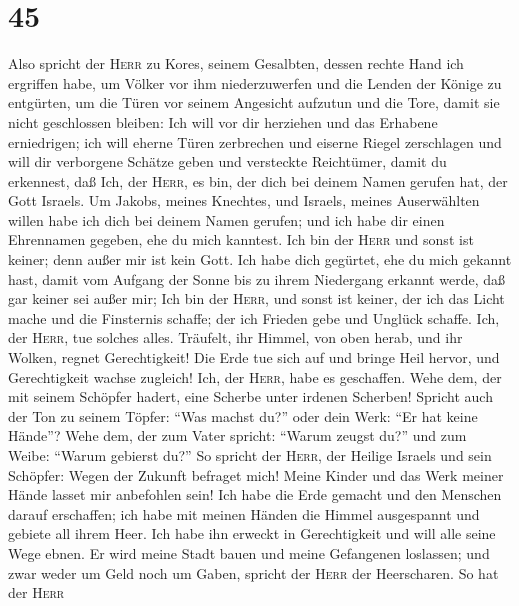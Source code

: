 \hypertarget{section-44}{%
\section{45}\label{section-44}}

 Also spricht der \textsc{Herr} zu Kores, seinem
Gesalbten, dessen rechte Hand ich ergriffen habe, um Völker vor ihm
niederzuwerfen und die Lenden der Könige zu entgürten, um die Türen vor
seinem Angesicht aufzutun und die Tore, damit sie nicht geschlossen
bleiben:  Ich will vor dir herziehen und das Erhabene
erniedrigen; ich will eherne Türen zerbrechen und eiserne Riegel
zerschlagen  und will dir verborgene Schätze geben und
versteckte Reichtümer, damit du erkennest, daß Ich, der \textsc{Herr},
es bin, der dich bei deinem Namen gerufen hat, der Gott Israels.
 Um Jakobs, meines Knechtes, und Israels, meines
Auserwählten willen habe ich dich bei deinem Namen gerufen; und ich habe
dir einen Ehrennamen gegeben, ehe du mich kanntest.  Ich
bin der \textsc{Herr} und sonst ist keiner; denn außer mir ist kein
Gott. Ich habe dich gegürtet, ehe du mich gekannt hast, 
damit vom Aufgang der Sonne bis zu ihrem Niedergang erkannt werde, daß
gar keiner sei außer mir; Ich bin der \textsc{Herr}, und sonst ist
keiner,  der ich das Licht mache und die Finsternis
schaffe; der ich Frieden gebe und Unglück schaffe. Ich, der
\textsc{Herr}, tue solches alles.  Träufelt, ihr Himmel,
von oben herab, und ihr Wolken, regnet Gerechtigkeit! Die Erde tue sich
auf und bringe Heil hervor, und Gerechtigkeit wachse zugleich! Ich, der
\textsc{Herr}, habe es geschaffen.  Wehe dem, der mit
seinem Schöpfer hadert, eine Scherbe unter irdenen Scherben! Spricht
auch der Ton zu seinem Töpfer: ``Was machst du?'' oder dein Werk: ``Er
hat keine Hände''?  Wehe dem, der zum Vater spricht:
``Warum zeugst du?'' und zum Weibe: ``Warum gebierst du?''
 So spricht der \textsc{Herr}, der Heilige Israels und
sein Schöpfer: Wegen der Zukunft befraget mich! Meine Kinder und das
Werk meiner Hände lasset mir anbefohlen sein!  Ich habe
die Erde gemacht und den Menschen darauf erschaffen; ich habe mit meinen
Händen die Himmel ausgespannt und gebiete all ihrem Heer.
 Ich habe ihn erweckt in Gerechtigkeit und will alle
seine Wege ebnen. Er wird meine Stadt bauen und meine Gefangenen
loslassen; und zwar weder um Geld noch um Gaben, spricht der
\textsc{Herr} der Heerscharen.  So hat der \textsc{Herr}
